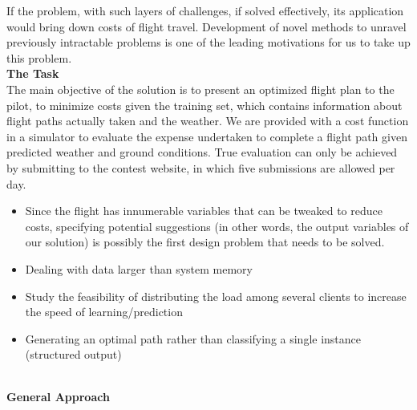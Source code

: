 \documentclass{article}[9pt]
\begin{document}
If the problem, with such layers of challenges, if solved effectively, its application would bring down costs of flight travel. Development of novel methods to unravel previously intractable problems is one of the leading motivations for us to take up this problem.\\
[\baselineskip]
\noindent
\Large{\textbf{The Task}} \\
\noindent The main objective of the solution is to present an optimized flight plan to the pilot, to minimize costs given the training set, which contains information about flight paths actually taken and the weather. We are provided with a cost function in a simulator to evaluate the expense undertaken to complete a flight path given predicted weather and ground conditions. True evaluation can only be achieved by submitting to the contest website, in which five submissions are allowed per day.
\begin{itemize}
	\item Since the flight has innumerable variables that can be tweaked to reduce costs, specifying potential suggestions (in other words, the output variables of our solution) is possibly the first design problem that needs to be solved.
	\item Dealing with data larger than system memory
	\item Study the feasibility of distributing the load among several clients to increase the speed of learning/prediction
	\item Generating an optimal path rather than classifying a single instance (structured output)
\end{itemize}
\noindent
\Large{\\\textbf{General Approach}}%
\end{document}

